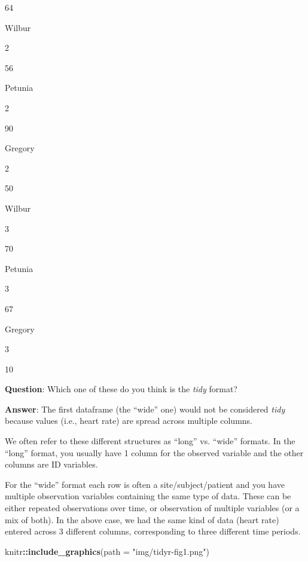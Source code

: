 \documentclass[]{book}
\newenvironment{Shaded}{\begin{snugshade}}{\end{snugshade}}
\newcommand{\DataTypeTok}[1]{\textcolor[rgb]{0.13,0.29,0.53}{#1}}
\newcommand{\KeywordTok}[1]{\textcolor[rgb]{0.13,0.29,0.53}{\textbf{#1}}}
\newcommand{\NormalTok}[1]{#1}
\newcommand{\OperatorTok}[1]{\textcolor[rgb]{0.81,0.36,0.00}{\textbf{#1}}}
\newcommand{\StringTok}[1]{\textcolor[rgb]{0.31,0.60,0.02}{#1}}
\begin{document}
64

Wilbur

2

56

Petunia

2

90

Gregory

2

50

Wilbur

3

70

Petunia

3

67

Gregory

3

10

\textbf{Question}: Which one of these do you think is the \emph{tidy} format?

\textbf{Answer}: The first dataframe (the ``wide'' one) would not be considered \emph{tidy} because values (i.e., heart rate) are spread across multiple columns.

We often refer to these different structures as ``long'' vs. ``wide'' formats. In the ``long'' format, you usually have 1 column for the observed variable and the other columns are ID variables.

For the ``wide'' format each row is often a site/subject/patient and you have multiple observation variables containing the same type of data. These can be either repeated observations over time, or observation of multiple variables (or a mix of both). In the above case, we had the same kind of data (heart rate) entered across 3 different columns, corresponding to three different time periods.

\begin{Shaded}
\begin{Highlighting}[]
\NormalTok{knitr}\OperatorTok{::}\KeywordTok{include_graphics}\NormalTok{(}\DataTypeTok{path =} \StringTok{"img/tidyr-fig1.png"}\NormalTok{)}
\end{Highlighting}
\end{Shaded}
\end{document}
